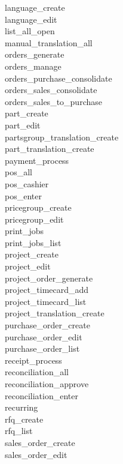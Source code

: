 \begin{description}
\item [language\_create]
\item [language\_edit]
\item [list\_all\_open]
\item [manual\_translation\_all]
\item [orders\_generate]
\item [orders\_manage]
\item [orders\_purchase\_consolidate]
\item [orders\_sales\_consolidate]
\item [orders\_sales\_to\_purchase]
\item [part\_create]
\item [part\_edit]
\item [partsgroup\_translation\_create]
\item [part\_translation\_create]
\item [payment\_process]
\item [pos\_all]
\item [pos\_cashier]
\item [pos\_enter]
\item [pricegroup\_create]
\item [pricegroup\_edit]
\item [print\_jobs]
\item [print\_jobs\_list]
\item [project\_create]
\item [project\_edit]
\item [project\_order\_generate]
\item [project\_timecard\_add]
\item [project\_timecard\_list]
\item [project\_translation\_create]
\item [purchase\_order\_create]
\item [purchase\_order\_edit]
\item [purchase\_order\_list]
\item [receipt\_process]
\item [reconciliation\_all]
\item [reconciliation\_approve]
\item [reconciliation\_enter]
\item [recurring]
\item [rfq\_create]
\item [rfq\_list]
\item [sales\_order\_create]
\item [sales\_order\_edit]

\end{description}
